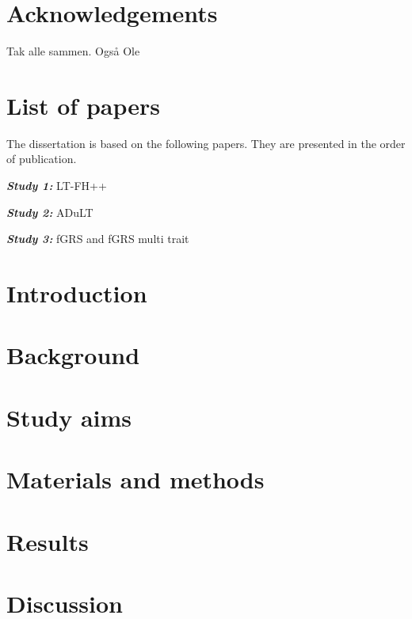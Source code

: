 \documentclass[a4paper, twoside]{report}
\begin{document}
\chapter*{Acknowledgements}
Tak alle sammen.
Også Ole

\chapter*{List of papers}
 
The dissertation is based on the following papers. They are presented in the order of publication.

\textbf{\textit{Study 1:}} LT-FH++

\textbf{\textit{Study 2:}} ADuLT

\textbf{\textit{Study 3:}} fGRS and fGRS multi trait


\tableofcontents
\newpage

\chapter{Introduction}


\chapter{Background}


\chapter{Study aims}


\chapter{Materials and methods}



\chapter{Results}



\chapter{Discussion}

\end{document}
